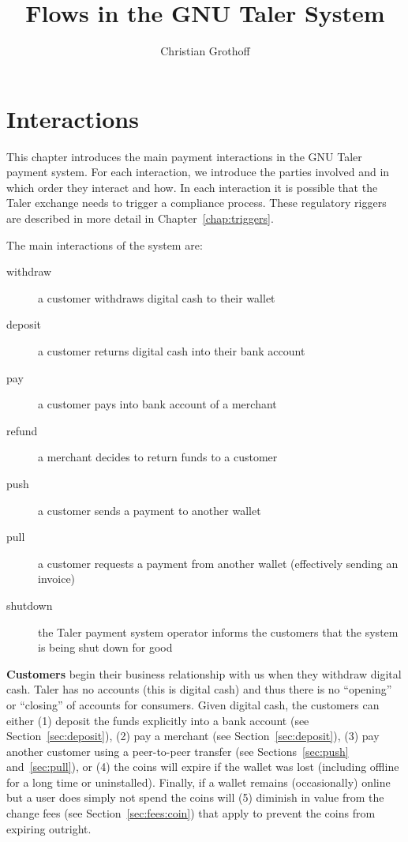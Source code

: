 \documentclass[10pt,a4paper,oneside]{book}
\author{Christian Grothoff}
\title{Flows in the GNU Taler System}
\begin{document}
\tableofcontents

\chapter{Interactions} \label{chap:interactions}

This chapter introduces the main payment interactions in the GNU Taler payment
system. For each interaction, we introduce the parties involved and in which
order they interact and how.  In each interaction it is possible that the
Taler exchange needs to trigger a compliance process.  These regulatory
riggers are described in more detail in Chapter~\ref{chap:triggers}.

The main interactions of the system are:

\begin{description}
  \item[withdraw] a customer withdraws digital cash to their wallet
  \item[deposit] a customer returns digital cash into their bank account
  \item[pay] a customer pays into bank account of a merchant
  \item[refund] a merchant decides to return funds to a customer
  \item[push] a customer sends a payment to another wallet
  \item[pull] a customer requests a payment from another wallet (effectively sending an invoice)
  \item[shutdown] the Taler payment system operator informs the customers that the system is being shut down for good
\end{description}

{\bf Customers} begin their business relationship with us when they withdraw
digital cash.  Taler has no accounts (this is digital cash) and thus there is
no ``opening'' or ``closing'' of accounts for consumers.  Given digital cash,
the customers can either (1) deposit the funds explicitly into a bank account
(see Section~\ref{sec:deposit}), (2) pay a merchant (see
Section~\ref{sec:deposit}), (3) pay another customer using a peer-to-peer
transfer (see Sections~\ref{sec:push} and~\ref{sec:pull}), or (4) the coins
will expire if the wallet was lost (including offline for a long time or
uninstalled).  Finally, if a wallet remains (occasionally) online but a user
does simply not spend the coins will (5) diminish in value from the change
fees (see Section~\ref{sec:fees:coin}) that apply to prevent the coins from
expiring outright.
\end{document}
